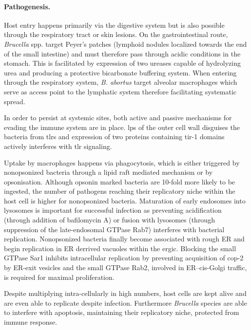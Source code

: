 \paragraph{Pathogenesis.}
Host entry happens primarily via the digestive system but is also possible through the respiratory tract or skin lesions. On the gastrointestinal route, \textit{Brucella} spp. target Peyer's patches (lymphoid nodules localized towards the end of the small intestine) and must therefore pass through acidic conditions in the stomach. This is facilitated by expression of two ureases capable of hydrolyzing urea and producing a protective bicarbonate buffering system. When entering through the respiratory system, \textit{B. abortus} target alveolar macrophages which serve as access point to the lymphatic system therefore facilitating systematic spread.


In order to persist at systemic sites, both active and passive mechanisms for evading the immune system are in place. \Gls{lps} of the outer cell wall disguises the bacteria from \glspl{tlr} and expression of two proteins containing \gls{tir-1} domains actively interferes with \gls{tlr} signaling.


Uptake by macrophages happens via phagocytosis, which is either triggered by nonopsonized bacteria through a lipid raft mediated mechanism or by opsonisation. Although opsonin marked bacteria are 10-fold more likely to be ingested, the number of pathogens reaching their replicatory niche within the host cell is higher for nonopsonized bacteria. Maturation of early endosomes into lysosomes is important for successful infection as preventing acidification (through addition of bafilomycin A) or fusion with lysosomes (through suppression of the late-endosomal GTPase Rab7) interferes with bacterial replication. Nonopsonized bacteria finally become associated with rough ER and begin replication in ER derrived vacuoles within the \gls{ergic}. Blocking the small GTPase Sar1 inhibits intracellular replication by preventing acquisition of \gls{cop-2} by ER-exit vesicles and the small GTPase Rab2, involved in ER--cis-Golgi traffic, is required for maximal proliferation.

Despite multiplying intra-cellularly in high numbers, host cells are kept alive and are even able to replicate despite infection. Furthermore \textit{Brucella} species are able to interfere with apoptosis, maintaining their replicatory niche, protected from immune response.

